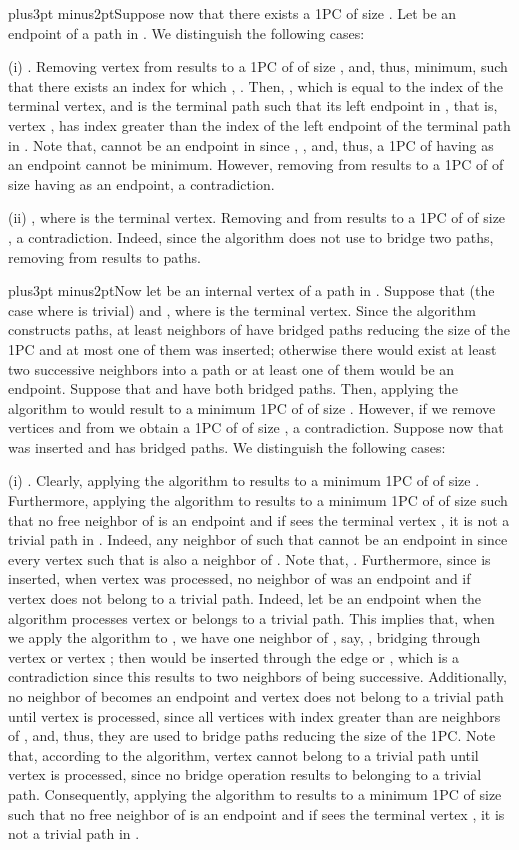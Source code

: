 \documentclass[10pt]{article}
\def\yskip{\penalty-50\vskip3pt plus3pt minus2pt}
\def\y{\yskip}
\begin{document}
{\y Suppose now that there exists a 1PC
 of size
. Let  be an endpoint of a path
 in . We distinguish the
following cases:

(i) . Removing vertex  from
 results to a 1PC of  of size
, and, thus, minimum, such that there
exists an index  for which , . Then, , which is equal to the index of the terminal
vertex, and  is the terminal path such that its left endpoint
in , that is, vertex , has
index greater than the index of the left endpoint of the terminal
path in . Note that,  cannot
be an endpoint in  since
, , and, thus, a 1PC of  having  as an endpoint
cannot be minimum. However, removing  from
 results to a 1PC of  of size
 having  as an endpoint, a
contradiction.

(ii) , where  is the terminal vertex. Removing
 and  from  results to a 1PC of  of size
, a contradiction. Indeed, since the
algorithm does not use  to bridge two paths, removing 
from  results to  paths.

\y Now let  be an internal vertex of a path  in .
Suppose that  (the case where  is trivial) and
, where  is the terminal vertex. Since the
algorithm constructs  paths, at least
 neighbors of  have bridged paths reducing the
size of the 1PC and at most one of them was inserted; otherwise
there would exist at least two successive neighbors into a path or
at least one of them would be an endpoint. Suppose that  and
 have both bridged paths. Then, applying the algorithm to
 would result to a minimum 1PC of
 of size .
However, if we remove vertices  and  from
 we obtain a 1PC of
 of size , a
contradiction. Suppose now that  was inserted and  has
bridged paths. We distinguish the following cases:

(i) . Clearly, applying the algorithm to 
results to a minimum 1PC of  of size
. Furthermore, applying the algorithm
to  results to a minimum 1PC  of
 of size  such that no
free neighbor of  is an endpoint and if  sees the
terminal vertex , it is not a trivial path in
. Indeed, any neighbor  of  such
that  cannot be an endpoint in  since
every vertex  such that  is also a neighbor of .
Note that, . Furthermore, since  is inserted, when
vertex  was processed, no neighbor of  was an
endpoint and if  vertex  does not belong to
a trivial path. Indeed, let  be an endpoint when
the algorithm processes vertex  or  belongs to a
trivial path. This implies that, when we apply the algorithm to
, we have one neighbor of , say, , bridging
through vertex  or vertex ; then  would be inserted
through the edge  or , which is a
contradiction since this results to two neighbors of  being
successive. Additionally, no neighbor of  becomes an endpoint
and vertex  does not belong to a trivial path until vertex
 is processed, since all vertices with index greater than
 are neighbors of , and, thus, they are used to bridge
paths reducing the size of the 1PC. Note that, according to the
algorithm, vertex  cannot belong to a trivial path until
vertex  is processed, since no bridge operation results
to  belonging to a trivial path. Consequently, applying the
algorithm to  results to a minimum 1PC
 of size
 such that no free neighbor of 
is an endpoint and if  sees the terminal vertex , it is
not a trivial path in .

}
\end{document}
